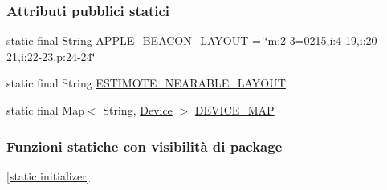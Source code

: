 \subsubsection*{Attributi pubblici statici}
\begin{DoxyCompactItemize}
\item 
static final String \hyperlink{classit_1_1unibo_1_1torsello_1_1bluetoothpositioning_1_1constant_1_1DeviceConstants_aceeec7a976dbf40e88728927bec61635_aceeec7a976dbf40e88728927bec61635}{A\+P\+P\+L\+E\+\_\+\+B\+E\+A\+C\+O\+N\+\_\+\+L\+A\+Y\+O\+UT} = \char`\"{}m\+:2-\/3=0215,i\+:4-\/19,i\+:20-\/21,i\+:22-\/23,p\+:24-\/24\char`\"{}
\item 
static final String \hyperlink{classit_1_1unibo_1_1torsello_1_1bluetoothpositioning_1_1constant_1_1DeviceConstants_ac80c3bbd15b47afacffefcdac59e7427_ac80c3bbd15b47afacffefcdac59e7427}{E\+S\+T\+I\+M\+O\+T\+E\+\_\+\+N\+E\+A\+R\+A\+B\+L\+E\+\_\+\+L\+A\+Y\+O\+UT}
\item 
static final Map$<$ String, \hyperlink{classit_1_1unibo_1_1torsello_1_1bluetoothpositioning_1_1model_1_1Device}{Device} $>$ \hyperlink{classit_1_1unibo_1_1torsello_1_1bluetoothpositioning_1_1constant_1_1DeviceConstants_adc3b2d4771c17a3ec55c070dfbe6151a_adc3b2d4771c17a3ec55c070dfbe6151a}{D\+E\+V\+I\+C\+E\+\_\+\+M\+AP}
\end{DoxyCompactItemize}
\subsubsection*{Funzioni statiche con visibilità di package}
\begin{DoxyCompactItemize}
\item 
\hyperlink{classit_1_1unibo_1_1torsello_1_1bluetoothpositioning_1_1constant_1_1DeviceConstants_a99a34b8f281a9d6229cf0adcdc9acd28_a99a34b8f281a9d6229cf0adcdc9acd28}{\mbox{[}static initializer\mbox{]}}
\end{DoxyCompactItemize}
